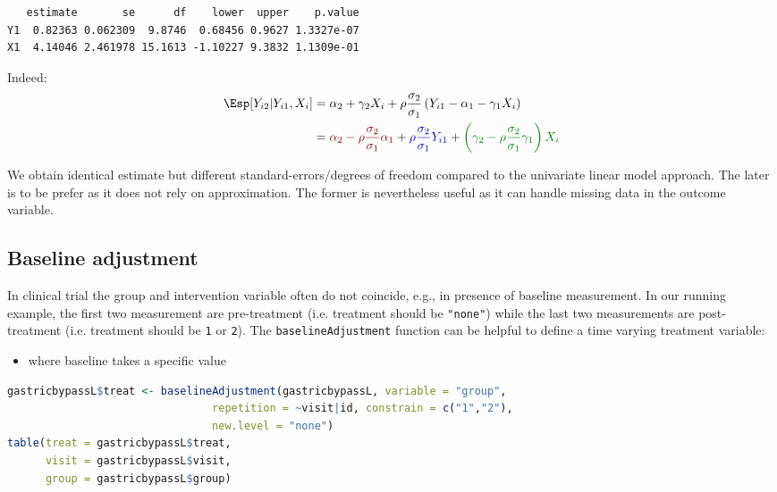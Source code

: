 \documentclass[12pt]{article}
\newcommand{\darkblue}{blue!80!black}
\newcommand{\darkgreen}{green!50!black}
\newcommand{\darkred}{red!50!black}
\begin{document}
\label{}
\begin{verbatim}
   estimate       se      df    lower  upper    p.value
Y1  0.82363 0.062309  9.8746  0.68456 0.9627 1.3327e-07
X1  4.14046 2.461978 15.1613 -1.10227 9.3832 1.1309e-01
\end{verbatim}


Indeed:
\begin{align*}
\Esp[Y_{i2}|Y_{i1},X_{i}] &= \alpha_2 + \gamma_2 X_{i} + \rho \frac{\sigma_2}{\sigma_1}\left(Y_{i1} - \alpha_1 - \gamma_1 X_{i}\right) \\
                         &= \textcolor{\darkred}{\alpha_2 - \rho \frac{\sigma_2}{\sigma_1} \alpha_1}
                         + \textcolor{\darkblue}{\rho \frac{\sigma_2}{\sigma_1}Y_{i1}}
                         + \textcolor{\darkgreen}{\left(\gamma_2 - \rho \frac{\sigma_2}{\sigma_1} \gamma_1\right)  X_{i} }
\end{align*}

We obtain identical estimate but different standard-errors/degrees of
freedom compared to the univariate linear model approach. The later is
to be prefer as it does not rely on approximation. The former is
nevertheless useful as it can handle missing data in the outcome
variable.

\clearpage
\subsection{Baseline adjustment}
\label{sec:org916b6c8}

In clinical trial the group and intervention variable often do not
coincide, e.g., in presence of baseline measurement. In our running
example, the first two measurement are pre-treatment (i.e. treatment
should be \texttt{"none"}) while the last two measurements are post-treatment
(i.e. treatment should be \texttt{1} or \texttt{2}). The \texttt{baselineAdjustment}
function can be helpful to define a time varying treatment variable:
\begin{itemize}
\item where baseline takes a specific value
\end{itemize}
\begin{lstlisting}[language=r,numbers=none]
gastricbypassL$treat <- baselineAdjustment(gastricbypassL, variable = "group",
                                repetition = ~visit|id, constrain = c("1","2"),
                                new.level = "none")
table(treat = gastricbypassL$treat,
      visit = gastricbypassL$visit,
      group = gastricbypassL$group)
\end{lstlisting}
\end{document}
